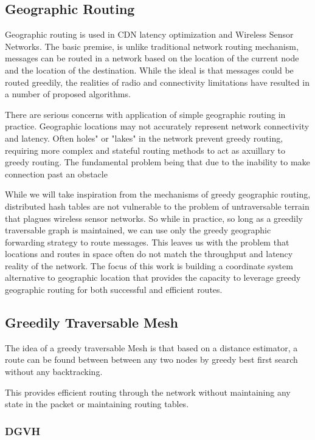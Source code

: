 \subsection{Geographic Routing}

Geographic routing is used in CDN latency optimization and Wireless Sensor Networks\cite{karp2000geographic}.
The basic premise, is unlike traditional network routing mechanism, messages can be routed in a network based on the location of the current node and the location of the destination.
While the ideal is that messages could be routed greedily, the realities of radio and connectivity limitations have resulted in a number of proposed algorithms.

There are serious concerns with application of simple geographic routing in practice.
Geographic locations may not accurately represent network connectivity and latency.
Often holes" or "lakes" in the network prevent greedy routing, requiring more complex and stateful routing methods to act as axuillary to greedy routing.
The fundamental problem being that due to the inability to make connection past an obstacle 

While we will take inspiration from the mechanisms of greedy geographic routing, distributed hash tables are not vulnerable to the problem of untraversable terrain that plagues wireless sensor networks. 
So while in practice, so long as a greedily traversable graph is maintained, we can use only the greedy geographic forwarding strategy to route messages.
This leaves us with the problem that locations and routes in space often do not match the throughput and latency reality of the network.
The focus of this work is building a coordinate system alternative to geographic location that provides the capacity to leverage greedy geographic routing for both successful and efficient routes.

\subsection{Greedily Traversable Mesh}

The idea of a greedy traversable Mesh is that based on a distance estimator, a route can be found between between any two nodes by greedy best first search without any backtracking.

This provides efficient routing through the network without maintaining any state in the packet or maintaining routing tables.

\subsubsection{DGVH}

